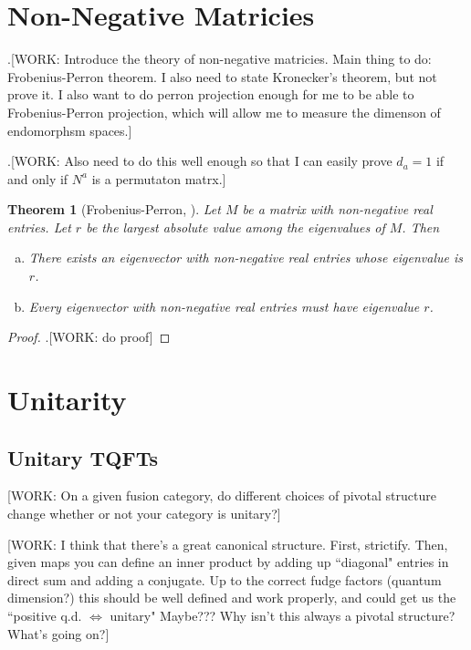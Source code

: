 \documentclass{article}
\newtheorem{theorem}{Theorem}[section]
\theoremstyle{definition}
\numberwithin{figure}{section}
\begin{document}
\section{Non-Negative Matricies}
\label{Non-Negative Matricies}

.[WORK: Introduce the theory of non-negative matricies. Main thing to do: Frobenius-Perron theorem. I also need to state Kronecker's theorem, but not prove it. I also want to do perron projection enough for me to be able to Frobenius-Perron projection, which will allow me to measure the dimenson of endomorphsm spaces.]

.[WORK: Also need to do this well enough so that I can easily prove $d_a=1$ if and only if $N^a$ is a permutaton matrx.]

\begin{theorem}[Frobenius-Perron, \cite{meyer2000perron}] Let $M$ be a matrix with non-negative real entries. Let $r$ be the largest absolute value among the eigenvalues of $M$. Then

\begin{enumerate}[(a)]
\item There exists an eigenvector with non-negative real entries whose eigenvalue is $r$.
\item Every eigenvector with non-negative real entries must have eigenvalue $r$.
\end{enumerate}

\end{theorem}
\begin{proof}.[WORK: do proof]
\end{proof}

\section{Unitarity}
\label{Unitarity}

\subsection{Unitary TQFTs}

[WORK: On a given fusion category, do different choices of pivotal structure change whether or not your category is unitary?]

[WORK: I think that there's a great canonical structure. First, strictify. Then, given maps you can define an inner product by adding up ``diagonal" entries in direct sum and adding a conjugate. Up to the correct fudge factors (quantum dimension?) this should be well defined and work properly, and could get us the ``positive q.d. $\iff$ unitary" Maybe??? Why isn't this always a pivotal structure? What's going on?]
\end{document}

